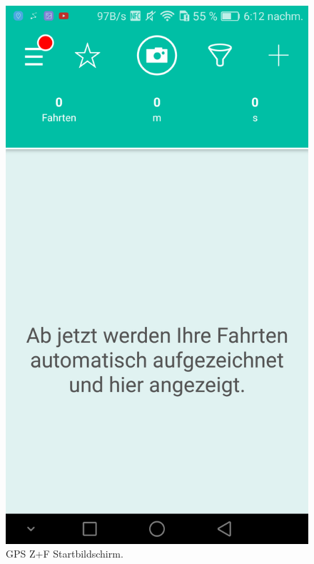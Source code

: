 \documentclass[a4paper]{article}
\begin{document}
\begin{figure}[H]%
    \begin{minipage}[b]{.4\linewidth} %
        \includegraphics[scale=0.14]{img/squ1}
        \caption{\label{img:img/squ1}GPS Z+F Startbildschirm.}
    \end{minipage}
    \hspace{0.1\linewidth}%
    \begin{minipage}[b]{.4\linewidth} %

\end{minipage}
\end{figure}
\end{document}
